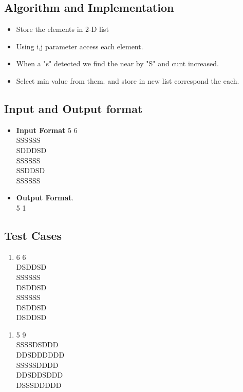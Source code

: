 \documentclass[a4paper,12pt]{article}
\begin{document}
\subsection{Algorithm and Implementation}
\begin{itemize}
\item Store the elements in 2-D list
\item Using i,j parameter access each element.
\item When a "s" detected we find the near by "S" and cunt increased.
\item Select min value from them. and store in new list correspond the each.
\end{itemize}

\subsection{Input and Output format}
\begin{itemize}
    \item \textbf{Input Format}
    5 6\\
    SSSSSS\\
    SDDDSD\\
    SSSSSS\\
    SSDDSD\\
    SSSSSS
     \item \textbf{Output Format}. \\
     5 1 
     
      
\end{itemize}

\subsection{Test Cases}
\begin{enumerate}
    \item 6 6\\
    DSDDSD\\
    SSSSSS\\
    DSDDSD\\
    SSSSSS\\
    DSDDSD\\
    DSDDSD\\
    
    
\end{enumerate}
\begin{enumerate}
	\item 5 9\\
    SSSSDSDDD\\ 
	DDSDDDDDD\\
	SSSSSDDDD\\
	DDSDDSDDD\\
	DSSSDDDDD\\

	
	
\end{enumerate}
\end{document}
